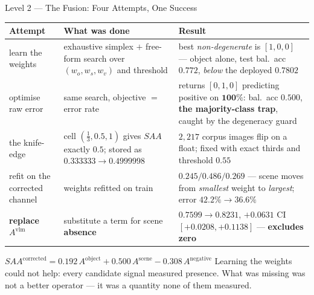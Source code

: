 \documentclass[aspectratio=169,11pt]{beamer}
\begin{document}
\begin{frame}{Level 2 --- The Fusion: Four Attempts, One Success}
\scriptsize
\begin{center}
\tiny
\begin{tabular}{@{}l p{4.0cm} p{4.4cm}@{}}
\toprule
\textbf{Attempt} & \textbf{What was done} & \textbf{Result} \\
\midrule
learn the weights & exhaustive simplex $+$ free-form search over $(w_o,w_s,w_v)$ and threshold & best \emph{non-degenerate} is $[1,0,0]$ --- object alone, test bal.\ acc $0.772$, \emph{below} the deployed $0.7802$ \\
\addlinespace
optimise raw error & same search, objective $=$ error rate & returns $[0,1,0]$ predicting positive on $\mathbf{100\%}$: bal.\ acc $0.500$, \textbf{the majority-class trap}, caught by the degeneracy guard \\
\addlinespace
the knife-edge & cell $(\tfrac13,0.5,1)$ gives $SAA$ exactly $0.5$; stored as $0.333333 \to 0.4999998$ & $2{,}217$ corpus images flip on a float; fixed with exact thirds and threshold $0.55$ \\
\addlinespace
refit on the corrected channel & weights refitted on train & $0.245 / 0.486 / 0.269$ --- scene moves from \emph{smallest} weight to \emph{largest}; error $42.2\% \to 36.6\%$ \\
\addlinespace
\textbf{replace $A^{\text{vlm}}$} & substitute a term for scene \textbf{absence} & $\mathbf{0.7599 \to 0.8231}$, $+0.0631$ CI $[+0.0208,+0.1138]$ --- \textbf{excludes zero} \\
\bottomrule
\end{tabular}
\end{center}
\vspace{-1mm}
\begin{exampleblock}{\scriptsize $SAA^{\text{corrected}} = 0.192\,A^{\text{object}} + 0.500\,A^{\text{scene}} - 0.308\,A^{\text{negative}}$}
\scriptsize Learning the weights could not help: every candidate signal measured presence. What was missing was not a better operator --- it was a quantity none of them measured.
\end{exampleblock}
\end{frame}
\end{document}
